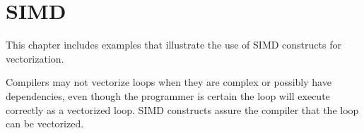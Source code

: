 \pagebreak
\chapter{SIMD}
\label{chap:simd}

This chapter includes examples that illustrate the use of SIMD constructs for vectorization.

Compilers may not vectorize loops when they are complex or possibly have 
dependencies, even though the programmer is certain the loop will execute 
correctly as a vectorized loop.  SIMD constructs assure the compiler 
that the loop can be vectorized.
